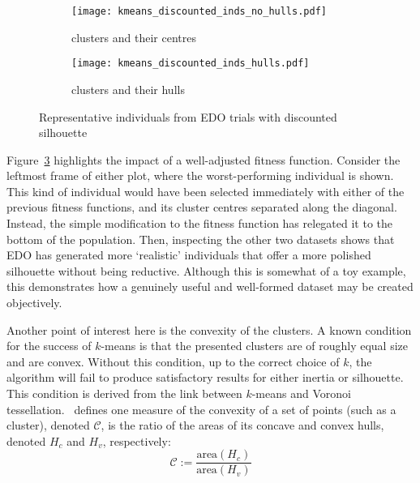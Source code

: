 \begin{figure}
    \centering
    \begin{subfigure}{\linewidth}
        \texttt{[image: kmeans\_discounted\_inds\_no\_hulls.pdf]}
        \caption{%
            clusters and their centres%
        }\label{fig:kmeans_discounted_inds_no_hulls}
    \end{subfigure}

    \vspace{1em}
    \begin{subfigure}{\linewidth}
        \texttt{[image: kmeans\_discounted\_inds\_hulls.pdf]}
        \caption{%
            clusters and their hulls%
        }\label{fig:kmeans_discounted_inds_hulls}
    \end{subfigure}
    \caption{%
        Representative individuals from EDO trials with discounted silhouette
    }\label{fig:kmeans_discounted_inds}
\end{figure}

Figure~\ref{fig:kmeans_discounted_inds} highlights the impact of a well-adjusted
fitness function. Consider the leftmost frame of either plot, where the
worst-performing individual is shown. This kind of individual would have been
selected immediately with either of the previous fitness functions, and its
cluster centres separated along the diagonal. Instead, the simple modification
to the fitness function has relegated it to the bottom of the population. Then,
inspecting the other two datasets shows that EDO has generated more `realistic'
individuals that offer a more polished silhouette without being reductive.
Although this is somewhat of a toy example, this demonstrates how a genuinely
useful and well-formed dataset may be created objectively.

Another point of interest here is the convexity of the clusters. A known
condition for the success of \(k\)-means is that the presented clusters are of
roughly equal size and are convex. Without this condition, up to the correct
choice of \(k\), the algorithm will fail to produce satisfactory results for
either inertia or silhouette. This condition is derived from the link between
\(k\)-means and Voronoi tessellation.~\cite{Sonka1993} defines one measure of
the convexity of a set of points (such as a cluster), denoted \(\mathcal C\), is
the ratio of the areas of its concave and convex hulls, denoted \(H_c\) and
\(H_v\), respectively:
\begin{equation}
    \mathcal C :=
    \frac{\text{area}\left(H_c\right)}{\text{area}\left(H_v\right)}
\end{equation}

